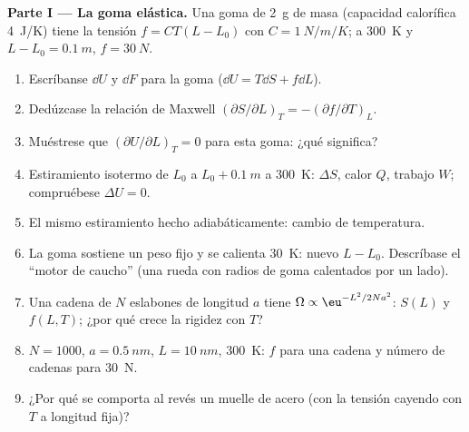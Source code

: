 \begin{problem}\label{pb:b2:thermodynamic-potentials:1}
\textbf{Parte I --- La goma elástica.}
Una goma de \qty{2}{g} de masa (capacidad calorífica \qty{4}{J/K}) tiene la tensión
$f = CT(L - L_0)$ con $C = \qty{1}{N/m/K}$; a \qty{300}{K} y $L - L_0 =
\qty{0.1}{m}$, $f = \qty{30}{N}$.
\begin{enumerate}
  \item Escríbanse $\dd U$ y $\dd F$ para la goma ($\dd U = T\dd S + f\dd L$).
  \item Dedúzcase la relación de Maxwell $(\partial S/\partial L)_T = -(\partial
        f/\partial T)_L$.
  \item Muéstrese que $(\partial U/\partial L)_T = 0$ para esta goma: ¿qué
        significa?
  \item Estiramiento isotermo de $L_0$ a $L_0 + \qty{0.1}{m}$ a
        \qty{300}{K}: $\Delta S$, calor $Q$, trabajo $W$; compruébese $\Delta U = 0$.
  \item El mismo estiramiento hecho adiabáticamente: cambio de temperatura.
  \item La goma sostiene un peso fijo y se calienta \qty{30}{K}: nuevo
        $L - L_0$. Descríbase el ``motor de caucho'' (una rueda con radios
        de goma calentados por un lado).
  \item Una cadena de $N$ eslabones de longitud $a$ tiene $\Omega \propto \eu^{-L^2/2Na^2}$:
        $S(L)$ y $f(L,T)$; ¿por qué crece la rigidez con $T$?
  \item $N = 1000$, $a = \qty{0.5}{nm}$, $L = \qty{10}{nm}$, \qty{300}{K}: $f$
        para una cadena y número de cadenas para \qty{30}{N}.
  \item ¿Por qué se comporta al revés un muelle de acero (con la tensión cayendo
        con $T$ a longitud fija)?
\end{enumerate}


\end{problem}
